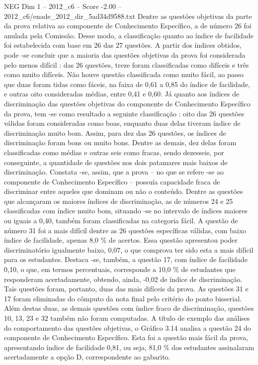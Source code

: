 \begin{textsample}{NEG Dim 1 – 2012\_c6 – Score -2.00 – 2012\_c6/enade\_2012\_dir\_5ad34d9588.txt}
Dentre as questões objetivas da parte da prova relativa ao componente de Conhecimento Específico, a de número 26 foi anulada pela Comissão.
Desse modo, a classificação quanto ao índice de facilidade foi estabelecida com base em 26 das 27 questões.
A partir dos índices obtidos, pode -se concluir que a maioria das questões objetivas da prova foi considerada pelo menos difícil : das 26 questões, treze foram classificadas como difíceis e três como muito difíceis.
Não houve questão classificada como muito fácil, ao passo que duas foram tidas como fáceis, na faixa de 0,61 a 0,85 do índice de facilidade, e outras oito consideradas médias, entre 0,41 e 0,60.
Já quanto aos índices de discriminação das questões objetivas do componente de Conhecimento Específico da prova, tem -se como resultado a seguinte classificação : oito das 26 questões válidas foram consideradas como boas, enquanto duas delas tiveram índice de discriminação muito bom.
Assim, para dez das 26 questões, os índices de discriminação foram bons ou muito bons.
Dentre as demais, dez delas foram classificadas como médias e outras seis como fracas, sendo dezesseis, por conseguinte, a quantidade de questões nos dois patamares mais baixos de discriminação.
Constata -se, assim, que a prova – no que se refere -se ao componente de Conhecimento Específico – possuía capacidade fraca de discriminar entre aqueles que dominam ou não o conteúdo.
Dentre as questões que alcançaram os maiores índices de discriminação, as de números 24 e 25 classificadas com índice muito bom, situando -se no intervalo de índices maiores ou iguais a 0,40, também foram classificadas na categoria fácil.
A questão de número 31 foi a mais difícil dentre as 26 questões específicas válidas, com baixo índice de facilidade, apenas 8,0 \% de acertos.
Essa questão apresentou poder discriminatório igualmente baixo, 0,07, o que comprova ter sido esta a mais difícil para os estudantes.
Destaca -se, também, a questão 17, com índice de facilidade 0,10, o que, em termos percentuais, corresponde a 10,0 \% de estudantes que responderam acertadamente, obtendo, ainda, -0,02 de índice de discriminação.
Tais questões foram, portanto, duas das mais difíceis da prova.
As questões 31 e 17 foram eliminadas do cômputo da nota final pelo critério do ponto bisserial.
Além destas duas, as demais questões com índice fraco de discriminação, questões 10, 13, 23 e 32 também não foram computadas.
A título de exemplo das análises do comportamento das questões objetivas, o Gráfico 3.14 analisa a questão 24 do componente de Conhecimento Específico.
Esta foi a questão mais fácil da prova, apresentando índice de facilidade 0,81, ou seja, 81,0 \% dos estudantes assinalaram acertadamente a opção D, correspondente ao gabarito.

\end{textsample}
